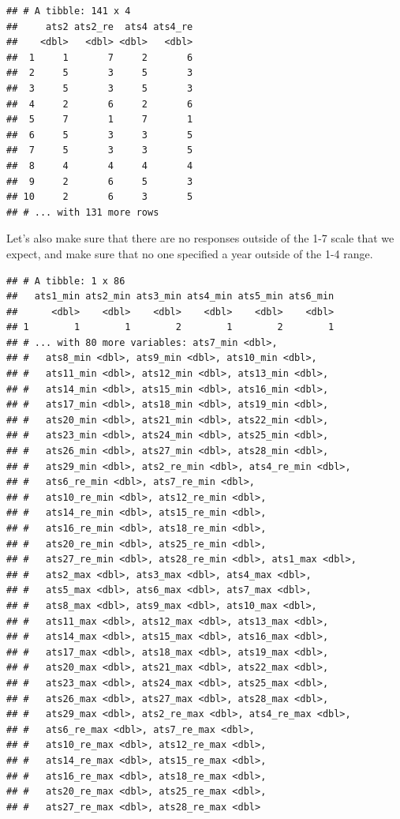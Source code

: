 \documentclass[12pt,]{book}
\newenvironment{Shaded}{\begin{snugshade}}{\end{snugshade}}
\newcommand{\KeywordTok}[1]{\textcolor[rgb]{0.13,0.29,0.53}{\textbf{#1}}}
\newcommand{\NormalTok}[1]{#1}
\newcommand{\OperatorTok}[1]{\textcolor[rgb]{0.81,0.36,0.00}{\textbf{#1}}}
\newcommand{\StringTok}[1]{\textcolor[rgb]{0.31,0.60,0.02}{#1}}
\begin{document}
\begin{verbatim}
## # A tibble: 141 x 4
##     ats2 ats2_re  ats4 ats4_re
##    <dbl>   <dbl> <dbl>   <dbl>
##  1     1       7     2       6
##  2     5       3     5       3
##  3     5       3     5       3
##  4     2       6     2       6
##  5     7       1     7       1
##  6     5       3     3       5
##  7     5       3     3       5
##  8     4       4     4       4
##  9     2       6     5       3
## 10     2       6     3       5
## # ... with 131 more rows
\end{verbatim}

Let's also make sure that there are no responses outside of the 1-7 scale that we expect, and make sure that no one specified a year outside of the 1-4 range.

\begin{Shaded}
\end{Shaded}

\begin{verbatim}
## # A tibble: 1 x 86
##   ats1_min ats2_min ats3_min ats4_min ats5_min ats6_min
##      <dbl>    <dbl>    <dbl>    <dbl>    <dbl>    <dbl>
## 1        1        1        2        1        2        1
## # ... with 80 more variables: ats7_min <dbl>,
## #   ats8_min <dbl>, ats9_min <dbl>, ats10_min <dbl>,
## #   ats11_min <dbl>, ats12_min <dbl>, ats13_min <dbl>,
## #   ats14_min <dbl>, ats15_min <dbl>, ats16_min <dbl>,
## #   ats17_min <dbl>, ats18_min <dbl>, ats19_min <dbl>,
## #   ats20_min <dbl>, ats21_min <dbl>, ats22_min <dbl>,
## #   ats23_min <dbl>, ats24_min <dbl>, ats25_min <dbl>,
## #   ats26_min <dbl>, ats27_min <dbl>, ats28_min <dbl>,
## #   ats29_min <dbl>, ats2_re_min <dbl>, ats4_re_min <dbl>,
## #   ats6_re_min <dbl>, ats7_re_min <dbl>,
## #   ats10_re_min <dbl>, ats12_re_min <dbl>,
## #   ats14_re_min <dbl>, ats15_re_min <dbl>,
## #   ats16_re_min <dbl>, ats18_re_min <dbl>,
## #   ats20_re_min <dbl>, ats25_re_min <dbl>,
## #   ats27_re_min <dbl>, ats28_re_min <dbl>, ats1_max <dbl>,
## #   ats2_max <dbl>, ats3_max <dbl>, ats4_max <dbl>,
## #   ats5_max <dbl>, ats6_max <dbl>, ats7_max <dbl>,
## #   ats8_max <dbl>, ats9_max <dbl>, ats10_max <dbl>,
## #   ats11_max <dbl>, ats12_max <dbl>, ats13_max <dbl>,
## #   ats14_max <dbl>, ats15_max <dbl>, ats16_max <dbl>,
## #   ats17_max <dbl>, ats18_max <dbl>, ats19_max <dbl>,
## #   ats20_max <dbl>, ats21_max <dbl>, ats22_max <dbl>,
## #   ats23_max <dbl>, ats24_max <dbl>, ats25_max <dbl>,
## #   ats26_max <dbl>, ats27_max <dbl>, ats28_max <dbl>,
## #   ats29_max <dbl>, ats2_re_max <dbl>, ats4_re_max <dbl>,
## #   ats6_re_max <dbl>, ats7_re_max <dbl>,
## #   ats10_re_max <dbl>, ats12_re_max <dbl>,
## #   ats14_re_max <dbl>, ats15_re_max <dbl>,
## #   ats16_re_max <dbl>, ats18_re_max <dbl>,
## #   ats20_re_max <dbl>, ats25_re_max <dbl>,
## #   ats27_re_max <dbl>, ats28_re_max <dbl>
\end{verbatim}
\end{document}
